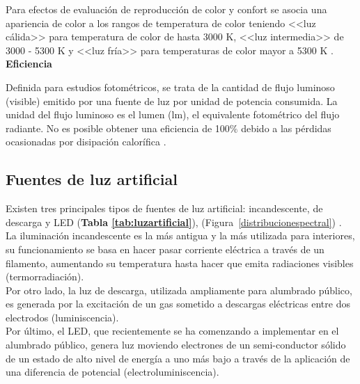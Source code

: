 Para efectos de evaluación de reproducción de color y confort se asocia una apariencia de color a los rangos de temperatura de color teniendo <<luz cálida>> para temperatura de color de hasta 3000 K, <<luz intermedia>> de 3000 - 5300 K y <<luz fría>> para temperaturas de color mayor a 5300 K \citep{Globaldiscussion}.\\


\textbf{Eficiencia}

Definida para estudios fotométricos, se trata de la cantidad de flujo luminoso (visible) emitido por una fuente de luz por unidad de potencia consumida. La unidad del flujo luminoso es el lumen (lm), el equivalente fotométrico del flujo radiante. No es posible obtener una eficiencia de 100$\%$ debido a las pérdidas ocasionadas por disipación calorífica \citep{LibroCL}.


\subsection{Fuentes de luz artificial}
\label{subsec:fuentesdeluz}

Existen tres principales tipos de fuentes de luz artificial: incandescente, de descarga y LED (\textbf{Tabla \ref{tab:luzartificial}}), (Figura~\ref{distribucionespectral})  \citep{Solano2013b, Eldvidge2010,LibroCL}.\\

La iluminación incandescente es la más antigua y la más utilizada para interiores, su funcionamiento se basa en hacer pasar corriente eléctrica a través de un filamento, aumentando su temperatura hasta hacer que emita radiaciones visibles (termorradiación).\\

Por otro lado, la luz de descarga, utilizada ampliamente para alumbrado público, es generada por la excitación de un gas sometido a descargas eléctricas entre dos electrodos (luminiscencia).\\

Por último, el LED, que recientemente se ha comenzando a implementar en el alumbrado público, genera luz moviendo electrones de un semi-conductor sólido de un estado de alto nivel de energía a uno más bajo a través de la aplicación de una diferencia de potencial (electroluminiscencia).


